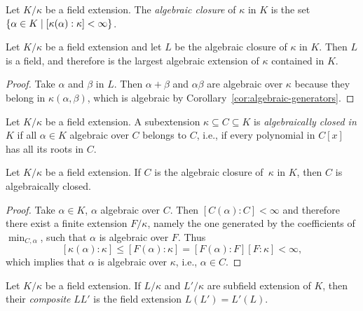 \begin{defn}
    Let $K/\kappa$ be a field extension. The \textsl{algebraic closure\/} of $\kappa$ in $K$ is the set $\{\alpha\in K\mid[\kappa(\alpha):\kappa]<\infty\}$.
\end{defn}

\begin{cor}
    Let\/ $K/\kappa$ be a field extension and let\/ $L$ be the algebraic closure of\/ $\kappa$ in\/ $K$. Then\/ $L$ is a field, and therefore is the largest algebraic extension of\/ $\kappa$ contained in\/ $K$.
\end{cor}

\begin{proof}
    Take $\alpha$ and $\beta$ in $L$. Then $\alpha+\beta$ and $\alpha\beta$ are algebraic over $\kappa$ because they belong in $\kappa(\alpha,\beta)$, which is algebraic by Corollary~\ref{cor:algebraic-generators}.
\end{proof}

\begin{defn}
    Let $K/\kappa$ be a field extension. A subextension $\kappa \subseteq C\subseteq K$ is \textsl{algebraically closed in} $K$ if all $\alpha\in K$ algebraic over $C$ belongs to $C$, i.e., if every polynomial in $C[x]$ has all its roots in $C$.
\end{defn}

\begin{cor}\label{cor:closures-are-alg-closed}
    Let\/ $K/\kappa$ be a field extension. If\/ $C$ is the algebraic closure of\/~$\kappa$ in\/ $K$, then\/ $C$ is algebraically closed.
\end{cor}

\begin{proof}
    Take $\alpha\in K$, $\alpha$ algebraic over $C$. Then $[C(\alpha):C]<\infty$ and therefore there exist a finite extension $F/\kappa$, namely the one generated by the coefficients of $\min_{C,\alpha}$, such that $\alpha$ is algebraic over $F$. Thus 
    $$
        [\kappa(\alpha):\kappa]\le[F(\alpha):\kappa]=[F(\alpha):F][F:\kappa]<\infty,
    $$
    which implies that $\alpha$ is algebraic over $\kappa$, i.e., $\alpha\in C$.
\end{proof} 

\begin{defn}
    Let $K/\kappa$ be a field extension. If $L/\kappa$ and $L'/\kappa$ are subfield extension of $K$, then their \textsl{composite} $LL'$ is the field extension $L(L')=L'(L)$.
\end{defn}

